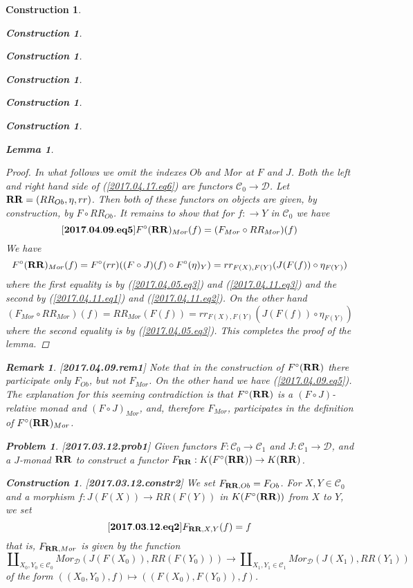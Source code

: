 \documentclass[12pt]{amsart}
\newenvironment{eq}{\begin{equation}}{\end{equation}}
\newtheorem{lemma}[proposition]{Lemma}
\newtheorem{remark}[proposition]{Remark}
\newtheorem{problem}[proposition]{Problem}
\newtheorem{construction}[proposition]{Construction}
\newcommand{\llabel}[1]{\label{#1}[{\bf #1}]}
\newcommand{\sr}{\rightarrow}
\newcommand{\RR}{{\bf RR}}
\newcommand{\C}{{\mathcal C}}
\newcommand{\D}{{\mathcal D}}
\begin{document}
\begin{construction}
\begin{construction}
\begin{construction}
\begin{construction}
\begin{construction}
\begin{construction}
\begin{lemma}
\begin{eq}
\end{eq}
%
\end{lemma}
%
\begin{proof}
In what follows we omit the indexes $Ob$ and $Mor$ at $F$ and $J$. Both the left and right hand side of (\ref{2017.04.17.eq6}) are functors $\C_0\sr\D$. Let $\RR=(RR_{Ob},\eta,rr)$. Then both of these functors on objects are given, by construction, by $F\circ RR_{Ob}$. It remains to show that for $f:\sr Y$ in $\C_0$ we have 
%
\begin{eq}
\llabel{2017.04.09.eq5}
F^{\circ}(\RR)_{Mor}(f)=(F_{Mor}\circ RR_{Mor})(f)
\end{eq}
%
We have
%
$$F^{\circ}(\RR)_{Mor}(f)=F^{\circ}(rr)((F\circ J)(f)\circ F^{\circ}(\eta)_Y)=rr_{F(X),F(Y)}(J(F(f))\circ \eta_{F(Y)})$$
%
where the first equality is by (\ref{2017.04.05.eq3}) and (\ref{2017.04.11.eq3}) and the second by (\ref{2017.04.11.eq1}) and (\ref{2017.04.11.eq2}). On the other hand 
%
$$(F_{Mor}\circ RR_{Mor})(f)=RR_{Mor}(F(f))=rr_{F(X),F(Y)}(J(F(f))\circ \eta_{F(Y)})$$
%
where the second equality is by (\ref{2017.04.05.eq3}). This completes the proof of the lemma.
\end{proof}
%
\begin{remark}\rm\llabel{2017.04.09.rem1}
Note that in the construction of $F^{\circ}(\RR)$ there participate only $F_{Ob}$, but not $F_{Mor}$. On the other hand we have (\ref{2017.04.09.eq5}). The explanation for this seeming contradiction is that $F^{\circ}(\RR)$ is a $(F\circ J)$-relative monad and $(F\circ J)_{Mor}$, and, therefore $F_{Mor}$, participates in the definition of $F^{\circ}(\RR)_{Mor}$.
\end{remark}
%
\begin{problem}
\llabel{2017.03.12.prob1}
Given functors $F:\C_0\sr \C_1$ and $J:\C_1\sr \D$, and a $J$-monad $\RR$ to construct a functor $F_{\RR}:K(F^{\circ}(\RR))\sr K(\RR)$. 
\end{problem}
%
\begin{construction}\rm
\llabel{2017.03.12.constr2}
We set $F_{\RR,Ob}=F_{Ob}$. For $X,Y\in\C_0$ and a morphism $f:J(F(X))\sr RR(F(Y))$ in $K(F^{\circ}(\RR))$ from $X$ to $Y$, we set
%
\begin{eq}
\llabel{2017.03.12.eq2}
F_{\RR,X,Y}(f)=f
\end{eq}
%
that is, $F_{\RR,Mor}$ is given by the function
%
$$\amalg_{X_0,Y_0\in\C_0}Mor_{\D}(J(F(X_0)),RR(F(Y_0)))\sr \amalg_{X_1,Y_1\in\C_1}Mor_{\D}(J(X_1),RR(Y_1))$$
%
of the form $((X_0,Y_0),f)\mapsto ((F(X_0),F(Y_0)),f)$. 


\end{construction}
\end{construction}
\end{construction}
\end{construction}
\end{construction}
\end{construction}
\end{construction}
\end{document}
